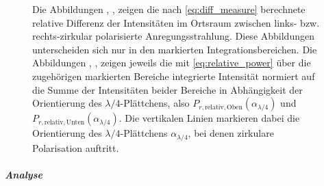 \documentclass[titlepage,  ngerman]{article}
\begin{document}
\begin{figure}
			\caption{Die Abbildungen , ,  zeigen die nach \eqref{eq:diff_measure} berechnete relative Differenz der Intensitäten im Ortsraum zwischen links- bzw. rechts-zirkular polarisierte Anregungsstrahlung. Diese Abbildungen unterscheiden sich nur in den markierten Integrationsbereichen. Die Abbildungen , ,  zeigen jeweils die mit \eqref{eq:relative_power} über die zugehörigen markierten Bereiche integrierte Intensität normiert auf die Summe der Intensitäten beider Bereiche in Abhängigkeit der Orientierung des $\lambda/4$-Plättchens, also $P_{r, \mathrm{relativ}, \mathrm{Oben}}(\alpha_{\lambda/4})$ und $P_{r, \mathrm{relativ}, \mathrm{Unten}}(\alpha_{\lambda/4})$. Die vertikalen Linien markieren dabei die Orientierung des $\lambda/4$-Plättchens $\alpha_{\lambda/4}$, bei denen zirkulare Polarisation auftritt.}
			\label{fig:spin_hall_measure_diff_fp}
		\end{figure}
		\subparagraph{Analyse}
\end{document}
